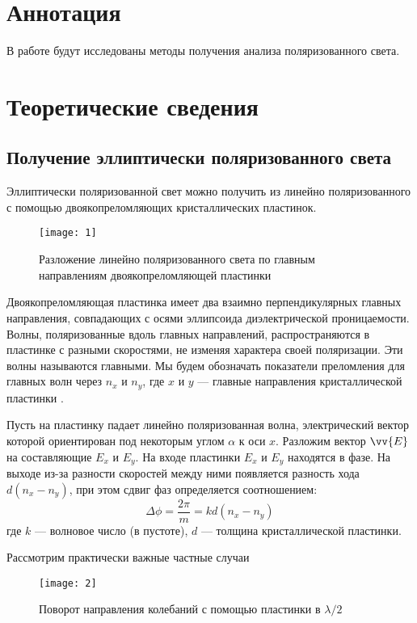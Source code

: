 \documentclass[a4paper, 12pt]{article}
\begin{document}

\section{Аннотация}
В работе будут исследованы методы получения анализа поляризованного
света.

\section{Теоретические сведения}
\subsection*{Получение эллиптически поляризованного света}
Эллиптически поляризованной свет можно получить из линейно
поляризованного с помощью двоякопреломляющих кристаллических
пластинок.

\begin{wrapfigure}{r}{0.3\linewidth}
    \texttt{[image: 1]}
    \caption{Разложение линейно поляризованного света по главным
    направлениям двоякопреломляющей пластинки}
    \label{fig:1}
\end{wrapfigure}

Двоякопреломляющая пластинка имеет два взаимно перпендикулярных
главных направления, совпадающих с осями эллипсоида диэлектрической
проницаемости. Волны, поляризованные вдоль главных направлений,
распространяются в пластинке с разными скоростями, не изменяя
характера своей поляризации. Эти волны называются главными. Мы будем
обозначать показатели преломления для главных волн через $n_x$ и
$n_y$, где $x$ и $y$ --- главные направления кристаллической пластинки
.

Пусть на пластинку падает линейно поляризованная волна, электрический
вектор которой ориентирован под некоторым углом $\alpha$ к оси $x$.
Разложим вектор $\vv{E}$ на составляющие $E_x$ и $E_y$. На входе
пластинки $E_x$ и $E_y$ находятся в фазе. На выходе из-за разности
скоростей между ними появляется разность хода $d(n_x-n_y)$, при этом
сдвиг фаз определяется соотношением:
\begin{equation}
    \Delta \phi = \frac{2\pi}{m}= kd(n_x-n_y)
    \label{eq:1}
\end{equation}
где $k$ --- волновое число (в пустоте), $d$ --- толщина
кристаллической пластинки.

Рассмотрим практически важные частные случаи

\begin{wrapfigure}[13]{l}{0.3\linewidth}
    \texttt{[image: 2]}
    \caption{Поворот направления колебаний с помощью пластинки в
    $\lambda/2$}
    \label{fig:2}
\end{wrapfigure}
\end{document}
